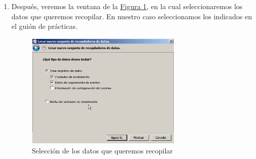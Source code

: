 \documentclass[10pt,a4paper,spanish]{article}
\numberwithin{equation}{section} %
\numberwithin{figure}{section} %
\numberwithin{table}{section} %
\begin{document}
\begin{enumerate}[1.]
    \item Después, veremos la ventana de la \hyperref[window]{Figura \ref*{window}}, en la cual seleccionaremos los datos que queremos recopilar. En nuestro caso seleccionamos los indicados en el guión de prácticas.

    \begin{figure}[!h]
        \centering
        \includegraphics[width=0.7\textwidth]{13}
        \caption{Selección de los datos que queremos recopilar}
        \label{window}
    \end{figure}


\end{enumerate}
\end{document}
